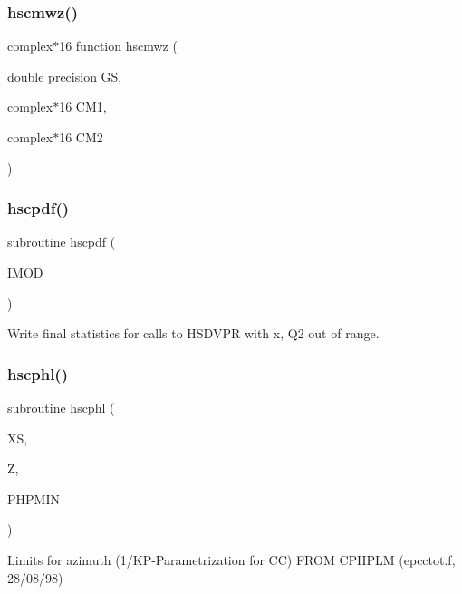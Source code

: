 \subsubsection{\texorpdfstring{hscmwz()}{hscmwz()}}
{\footnotesize\ttfamily complex$\ast$16 function hscmwz (\begin{DoxyParamCaption}\item[{double precision}]{GS,  }\item[{complex$\ast$16}]{C\+M1,  }\item[{complex$\ast$16}]{C\+M2 }\end{DoxyParamCaption})}

\mbox{\label{djangoh__h_8f_a948c29703e0ad618c41e77d47f6b9dcc}} 
\subsubsection{\texorpdfstring{hscpdf()}{hscpdf()}}
{\footnotesize\ttfamily subroutine hscpdf (\begin{DoxyParamCaption}\item[{}]{I\+M\+OD }\end{DoxyParamCaption})}



Write final statistics for calls to H\+S\+D\+V\+PR with x, Q2 out of range. 

\mbox{\label{djangoh__h_8f_ac0cdf5845e2bc8c727f04dc6887522ac}} 
\subsubsection{\texorpdfstring{hscphl()}{hscphl()}}
{\footnotesize\ttfamily subroutine hscphl (\begin{DoxyParamCaption}\item[{}]{XS,  }\item[{}]{Z,  }\item[{}]{P\+H\+P\+M\+IN }\end{DoxyParamCaption})}



Limits for azimuth (1/\+K\+P-\/\+Parametrization for CC) F\+R\+OM C\+P\+H\+P\+LM (epcctot.\+f, 28/08/98) 

\mbox{\label{djangoh__h_8f_a394d43e9f2d86e852f18e5c0763e65ea}} 
